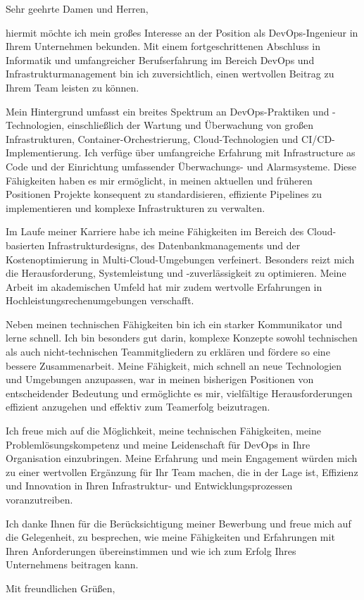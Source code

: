 \documentclass[]{main}
\begin{document}
\begin{letter}{}
    \vspace*{-15\baselineskip}
    \opening{Sehr geehrte Damen und Herren,}
    \vspace{1em}

    hiermit möchte ich mein großes Interesse an der Position als DevOps-Ingenieur in Ihrem Unternehmen bekunden. Mit einem fortgeschrittenen Abschluss in Informatik und umfangreicher Berufserfahrung im Bereich DevOps und Infrastrukturmanagement bin ich zuversichtlich, einen wertvollen Beitrag zu Ihrem Team leisten zu können.

    Mein Hintergrund umfasst ein breites Spektrum an DevOps-Praktiken und -Technologien, einschließlich der Wartung und Überwachung von großen Infrastrukturen, Container-Orchestrierung, Cloud-Technologien und CI/CD-Implementierung. Ich verfüge über umfangreiche Erfahrung mit Infrastructure as Code und der Einrichtung umfassender Überwachungs- und Alarmsysteme. Diese Fähigkeiten haben es mir ermöglicht, in meinen aktuellen und früheren Positionen Projekte konsequent zu standardisieren, effiziente Pipelines zu implementieren und komplexe Infrastrukturen zu verwalten.

    Im Laufe meiner Karriere habe ich meine Fähigkeiten im Bereich des Cloud-basierten Infrastrukturdesigns, des Datenbankmanagements und der Kostenoptimierung in Multi-Cloud-Umgebungen verfeinert. Besonders reizt mich die Herausforderung, Systemleistung und -zuverlässigkeit zu optimieren. Meine Arbeit im akademischen Umfeld hat mir zudem wertvolle Erfahrungen in Hochleistungsrechenumgebungen verschafft.

    Neben meinen technischen Fähigkeiten bin ich ein starker Kommunikator und lerne schnell. Ich bin besonders gut darin, komplexe Konzepte sowohl technischen als auch nicht-technischen Teammitgliedern zu erklären und fördere so eine bessere Zusammenarbeit. Meine Fähigkeit, mich schnell an neue Technologien und Umgebungen anzupassen, war in meinen bisherigen Positionen von entscheidender Bedeutung und ermöglichte es mir, vielfältige Herausforderungen effizient anzugehen und effektiv zum Teamerfolg beizutragen.

    Ich freue mich auf die Möglichkeit, meine technischen Fähigkeiten, meine Problemlösungskompetenz und meine Leidenschaft für DevOps in Ihre Organisation einzubringen. Meine Erfahrung und mein Engagement würden mich zu einer wertvollen Ergänzung für Ihr Team machen, die in der Lage ist, Effizienz und Innovation in Ihren Infrastruktur- und Entwicklungsprozessen voranzutreiben.

    Ich danke Ihnen für die Berücksichtigung meiner Bewerbung und freue mich auf die Gelegenheit, zu besprechen, wie meine Fähigkeiten und Erfahrungen mit Ihren Anforderungen übereinstimmen und wie ich zum Erfolg Ihres Unternehmens beitragen kann.

    \vspace{3em}
    \closing{Mit freundlichen Grüßen,\\\name}
\end{letter}
\end{document}
